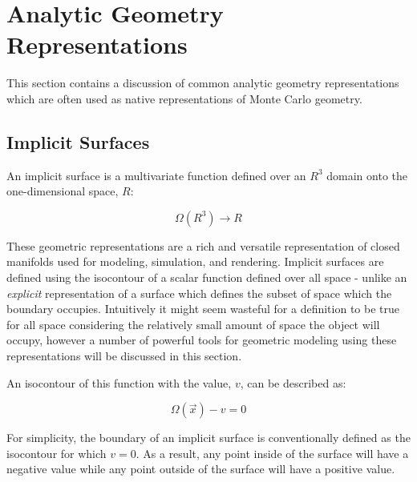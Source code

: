 
\section{Analytic Geometry Representations}\label{sec:analytic_geometry}

This section contains a discussion of common analytic geometry  representations
which are often used as native representations of Monte Carlo geometry.

\subsection{Implicit Surfaces}\label{subsec:implicit_surfaces}

An implicit surface is a multivariate function defined over an $ R^3 $ domain
onto the one-dimensional space, $ R $:

\begin{equation}
    \Omega(R^3)\rightarrow R
\end{equation}

These geometric representations are a rich and versatile representation of
closed manifolds used for modeling, simulation, and rendering. Implicit surfaces
are defined using the isocontour of a scalar function defined over all space -
unlike an \textit{explicit} representation of a surface which defines the subset
of space which the boundary occupies. Intuitively it might seem wasteful for a
definition to be true for all space considering the relatively small amount of
space the object will occupy, however a number of powerful tools for geometric
modeling using these representations will be discussed in this section.

An isocontour of this function with the value, $v$, can be described as:

\begin{equation}
  \Omega(\vec{x}) - v  = 0 
\end{equation}

For simplicity, the boundary of an implicit surface is conventionally defined as
the isocontour for which $v=0$. As a result, any point inside of the surface
will have a negative value while any point outside of the surface will have a
positive value.

